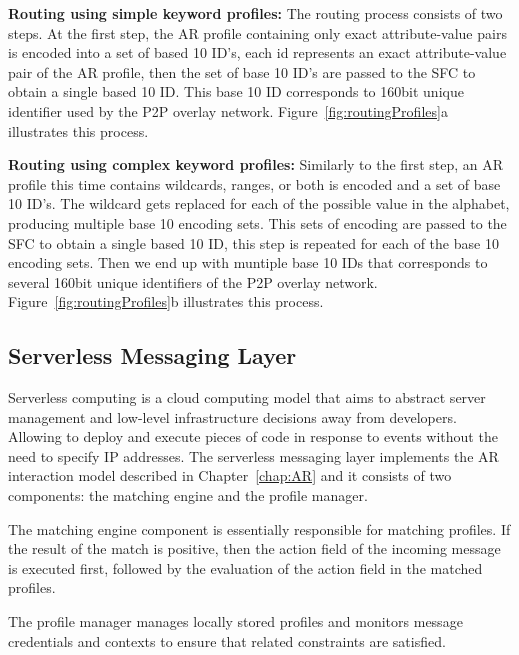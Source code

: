 \textbf{Routing using simple keyword profiles:} The routing process consists of two steps. At the first step, the AR profile containing only exact attribute-value pairs is encoded into a set of based 10 ID's, each id represents an exact attribute-value pair of the AR profile, then the set of base 10 ID's are passed to the SFC to obtain a single based 10 ID. This base 10 ID corresponds to 160bit unique identifier used by the P2P overlay network. Figure~\ref{fig:routingProfiles}a illustrates this process. \vspace{1ex} 

\textbf{Routing using complex keyword profiles:} Similarly to the first step, an AR profile this time contains wildcards, ranges, or both is encoded and a set of base 10 ID's. The wildcard gets replaced for each of the possible value in the alphabet, producing multiple base 10 encoding sets. This sets of encoding are passed to the SFC to obtain a single based 10 ID, this step is repeated for each of the base 10 encoding sets. Then we end up with muntiple base 10 IDs that corresponds to several 160bit unique identifiers of the P2P overlay network. Figure~\ref{fig:routingProfiles}b illustrates this process.

\subsection{Serverless Messaging Layer}\label{sec:serverless}


Serverless computing is a cloud computing model that aims to abstract server management and low-level infrastructure decisions away from developers. Allowing to deploy and execute pieces of code in response to events without the need to specify IP addresses. The serverless messaging layer implements the AR interaction model described in Chapter~\ref{chap:AR} and it consists of two components: the matching engine and the profile manager. 

The matching engine component is essentially responsible for matching profiles. If the result of the match is positive, then the action field of the incoming message is executed first, followed by the evaluation of the action field in the matched profiles. 

The profile manager manages locally stored profiles and monitors message credentials and contexts to ensure that related constraints are satisfied.

